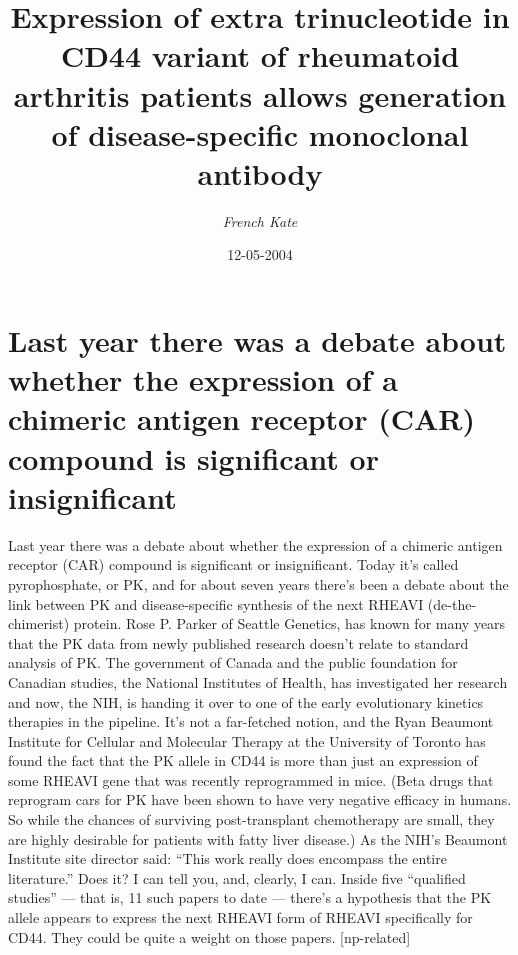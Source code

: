 \documentclass{article}%
\title{Expression of extra trinucleotide in CD44 variant of rheumatoid arthritis patients allows generation of disease{-}specific monoclonal antibody}%
\author{\textit{French Kate}}%
\date{12-05-2004}%
\begin{document}
%
\normalsize%
\maketitle%
\section{Last year there was a debate about whether the expression of a chimeric antigen receptor (CAR) compound is significant or insignificant}%
\label{sec:Lastyeartherewasadebateaboutwhethertheexpressionofachimericantigenreceptor(CAR)compoundissignificantorinsignificant}%
Last year there was a debate about whether the expression of a chimeric antigen receptor (CAR) compound is significant or insignificant. Today it’s called pyrophosphate, or PK, and for about seven years there’s been a debate about the link between PK and disease{-}specific synthesis of the next RHEAVI (de{-}the{-}chimerist) protein.\newline%
Rose P. Parker of Seattle Genetics, has known for many years that the PK data from newly published research doesn’t relate to standard analysis of PK. The government of Canada and the public foundation for Canadian studies, the National Institutes of Health, has investigated her research and now, the NIH, is handing it over to one of the early evolutionary kinetics therapies in the pipeline.\newline%
It’s not a far{-}fetched notion, and the Ryan Beaumont Institute for Cellular and Molecular Therapy at the University of Toronto has found the fact that the PK allele in CD44 is more than just an expression of some RHEAVI gene that was recently reprogrammed in mice. (Beta drugs that reprogram cars for PK have been shown to have very negative efficacy in humans. So while the chances of surviving post{-}transplant chemotherapy are small, they are highly desirable for patients with fatty liver disease.)\newline%
As the NIH’s Beaumont Institute site director said: “This work really does encompass the entire literature.”\newline%
Does it? I can tell you, and, clearly, I can.\newline%
Inside five “qualified studies” — that is, 11 such papers to date — there’s a hypothesis that the PK allele appears to express the next RHEAVI form of RHEAVI specifically for CD44. They could be quite a weight on those papers.\newline%
{[}np{-}related{]}\newline%
\end{document}
